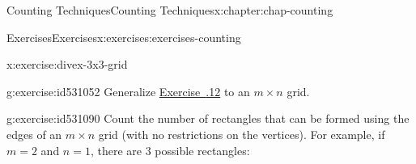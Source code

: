 \documentclass[oneside,10pt,]{book}
\newcommand{\xreffont}{\relax}
\numberwithin{equation}{section}
\begin{document}
\begin{chapterptx}{Counting Techniques}{}{Counting Techniques}{}{}{x:chapter:chap-counting}
\begin{exercises-section}{Exercises}{}{Exercises}{}{}{x:exercises:exercises-counting}
\begin{divisionexercise}{12}{}{}{x:exercise:divex-3x3-grid}
\begin{sidebyside}{3}{0.0916666666666667}{0.0916666666666667}{0.183333333333333}
\begin{sbspanel}{0.15}%
%
\end{sbspanel}%
\begin{sbspanel}{0.15}%
%
\end{sbspanel}%
\end{sidebyside}%
\end{divisionexercise}%
\begin{divisionexercise}{13}{}{}{g:exercise:id531052}%
Generalize \hyperlink{x:exercise:divex-3x3-grid}{Exercise~{\xreffont 2.7.12}} to an \(m \times n\) grid.%
\end{divisionexercise}%
\begin{divisionexercise}{14}{}{}{g:exercise:id531090}%
Count the number of rectangles that can be formed using the edges of an \(m \times n\) grid (with no restrictions on the vertices). For example, if \(m = 2\) and \(n = 1\), there are 3 possible rectangles:%
\begin{sidebyside}{3}{0.0916666666666667}{0.0916666666666667}{0.183333333333333}%
\begin{sbspanel}{0.15}%
%
\end{sbspanel}%
\begin{sbspanel}{0.15}%
%
\end{sbspanel}%
\begin{sbspanel}{0.15}%

\end{sbspanel}
\end{sidebyside}
\end{divisionexercise}
\end{exercises-section}
\end{chapterptx}
\end{document}
